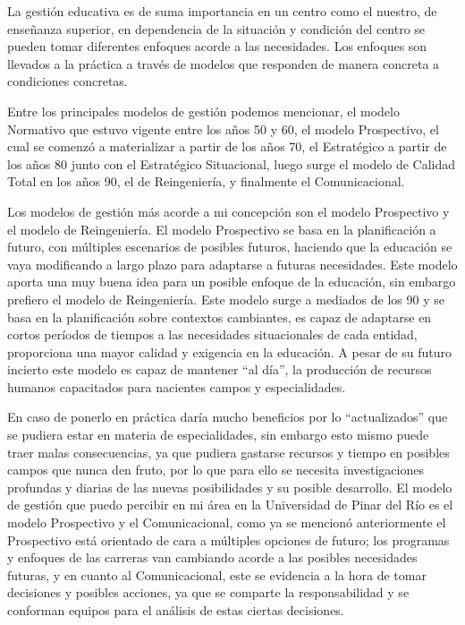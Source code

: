 \documentclass{article}
\begin{document}
{\justifying\fontsize{13}{18}\large La gestión educativa es de suma importancia en un centro como el nuestro, de enseñanza superior,
en dependencia de la situación y condición del centro se pueden tomar diferentes enfoques acorde a
las necesidades. Los enfoques son llevados a la práctica a través de modelos que responden de manera
concreta a condiciones concretas.

Entre los principales modelos de gestión podemos mencionar, el modelo Normativo que estuvo
vigente entre los años 50 y 60, el modelo Prospectivo, el cual se comenzó a materializar a partir de
los años 70, el Estratégico a partir de los años 80 junto con el Estratégico Situacional, luego surge el
modelo de Calidad Total en los años 90, el de Reingeniería, y finalmente el Comunicacional. \hyperref[RUP]{\text{$[4]$}}

Los modelos de gestión más acorde a mi concepción son el modelo Prospectivo y el modelo de
Reingeniería. El modelo Prospectivo se basa en la planificación a futuro, con múltiples escenarios de
posibles futuros, haciendo que la educación se vaya modificando a largo plazo para adaptarse a futuras
necesidades. Este modelo aporta una muy buena idea para un posible enfoque de la educación, sin
embargo prefiero el modelo de Reingeniería. Este modelo surge a mediados de los 90 y se basa en la
planificación sobre contextos cambiantes, es capaz de adaptarse en cortos períodos de tiempos a las
necesidades situacionales de cada entidad, proporciona una mayor calidad y exigencia en la educación.
A pesar de su futuro incierto este modelo es capaz de mantener ``al día'', la producción de recursos
humanos capacitados para nacientes campos y especialidades.

En caso de ponerlo en práctica daría mucho beneficios por lo ``actualizados'' que se pudiera estar en
materia de especialidades, sin embargo esto mismo puede traer malas consecuencias, ya que pudiera
gastarse recursos y tiempo en posibles campos que nunca den fruto, por lo que para ello se necesita
investigaciones profundas y diarias de las nuevas posibilidades y su posible desarrollo.
El modelo de gestión que puedo percibir en mi área en la Universidad de Pinar del Río es el modelo
Prospectivo y el Comunicacional, como ya se mencionó anteriormente el Prospectivo está orientado de
cara a múltiples opciones de futuro; los programas y enfoques de las carreras van cambiando acorde a
las posibles necesidades futuras, y en cuanto al Comunicacional, este se evidencia a la hora de tomar
decisiones y posibles acciones, ya que se comparte la responsabilidad y se conforman equipos para el
análisis de estas ciertas decisiones.}
\end{document}
